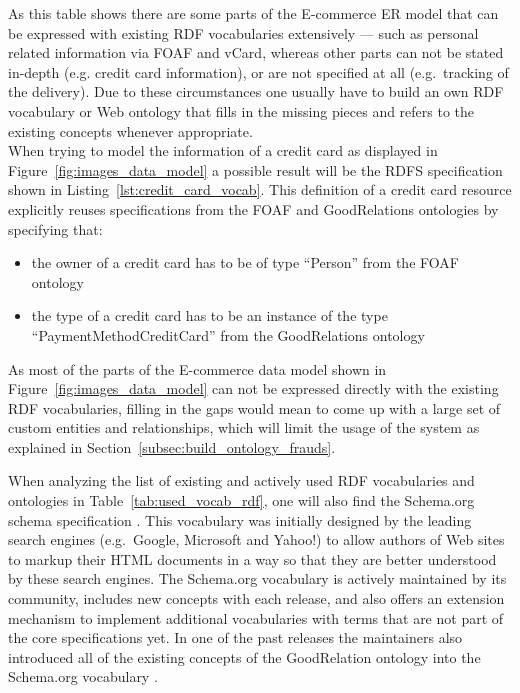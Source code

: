 As this table shows there are some parts of the \gls{E-commerce} \gls{ER} model that can be expressed with existing \gls{RDF} vocabularies extensively --- such as personal related information via \gls{FOAF} and \gls{vCard}, whereas other parts can not be stated in-depth (e.g. credit card information), or are not specified at all (e.g.\ tracking of the delivery). Due to these circumstances one usually have to build an own \gls{RDF} vocabulary or Web ontology that fills in the missing pieces and refers to the existing concepts whenever appropriate.\\

When trying to model the information of a credit card as displayed in Figure~\ref{fig:images_data_model} a possible result will be the \gls{RDFS} specification shown in Listing~\ref{lst:credit_card_vocab}. This definition of a credit card resource explicitly reuses specifications from the \gls{FOAF} and GoodRelations ontologies by specifying that: \@

\begin{itemize}
 \item the owner of a credit card has to be of type ``Person'' from the \gls{FOAF} ontology
 \item the type of a credit card has to be an instance of the type ``PaymentMethodCreditCard'' from the GoodRelations ontology
\end{itemize}

As most of the parts of the \gls{E-commerce} data model shown in Figure~\ref{fig:images_data_model} can not be expressed directly with the existing \gls{RDF} vocabularies, filling in the gaps would mean to come up with a large set of custom entities and relationships, which will limit the usage of the system as explained in Section~\ref{subsec:build_ontology_frauds}.


When analyzing the list of existing and actively used \gls{RDF} vocabularies and ontologies in Table~\ref{tab:used_vocab_rdf}, one will also find the Schema.org schema specification \citep{Schema.org}. This vocabulary was initially designed by the leading search engines (e.g.\ Google, Microsoft and Yahoo!) to allow authors of Web sites to markup their \gls{HTML} documents in a way so that they are better understood by these search engines. The Schema.org vocabulary is actively maintained by its community, includes new concepts with each release, and also offers an extension mechanism to implement additional vocabularies with terms that are not part of the core specifications \citep{SchemaExtensions} yet. In one of the past releases the maintainers also introduced all of the existing concepts of the GoodRelation ontology into the Schema.org vocabulary \citep{SchemaGoodRelation}. \\

